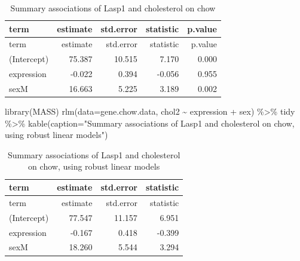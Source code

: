 \documentclass[
]{article}
\newenvironment{Shaded}{\begin{snugshade}}{\end{snugshade}}
\newcommand{\AttributeTok}[1]{\textcolor[rgb]{0.77,0.63,0.00}{#1}}
\newcommand{\FunctionTok}[1]{\textcolor[rgb]{0.00,0.00,0.00}{#1}}
\newcommand{\NormalTok}[1]{#1}
\newcommand{\SpecialCharTok}[1]{\textcolor[rgb]{0.00,0.00,0.00}{#1}}
\newcommand{\StringTok}[1]{\textcolor[rgb]{0.31,0.60,0.02}{#1}}
\begin{document}
\begin{longtable}[]{@{}lrrrr@{}}
\caption{Summary associations of Lasp1 and cholesterol on
chow}\tabularnewline
\toprule()
term & estimate & std.error & statistic & p.value \\
\midrule()
\endfirsthead
\toprule()
term & estimate & std.error & statistic & p.value \\
\midrule()
\endhead
(Intercept) & 75.387 & 10.515 & 7.170 & 0.000 \\
expression & -0.022 & 0.394 & -0.056 & 0.955 \\
sexM & 16.663 & 5.225 & 3.189 & 0.002 \\
\bottomrule()
\end{longtable}

\begin{Shaded}
\begin{Highlighting}[]
\FunctionTok{library}\NormalTok{(MASS)}
\FunctionTok{rlm}\NormalTok{(}\AttributeTok{data=}\NormalTok{gene.chow.data, chol2 }\SpecialCharTok{\textasciitilde{}}\NormalTok{ expression }\SpecialCharTok{+}\NormalTok{ sex) }\SpecialCharTok{\%\textgreater{}\%}
\NormalTok{  tidy }\SpecialCharTok{\%\textgreater{}\%}
  \FunctionTok{kable}\NormalTok{(}\AttributeTok{caption=}\StringTok{"Summary associations of Lasp1 and cholesterol on chow, using robust linear models"}\NormalTok{)}
\end{Highlighting}
\end{Shaded}

\begin{longtable}[]{@{}lrrr@{}}
\caption{Summary associations of Lasp1 and cholesterol on chow, using
robust linear models}\tabularnewline
\toprule()
term & estimate & std.error & statistic \\
\midrule()
\endfirsthead
\toprule()
term & estimate & std.error & statistic \\
\midrule()
\endhead
(Intercept) & 77.547 & 11.157 & 6.951 \\
expression & -0.167 & 0.418 & -0.399 \\
sexM & 18.260 & 5.544 & 3.294 \\
\bottomrule()
\end{longtable}
\end{document}
